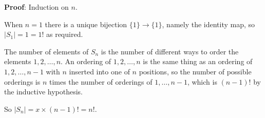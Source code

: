 \begin{paracol}{2}


\switchcolumn


\textbf{Proof}: Induction on $n$.

When $n = 1$ there is a unique bijection $\{1\} \rightarrow \{1\}$, namely the identity map, so $\mid S_1 \mid = 1 = 1!$ as required.

The number of elements of $S_n$ is the number of different ways to order the elements $1, 2, \dots, n$. An ordering of $1, 2, \dots, n$ is the same thing as an ordering of $1, 2, \dots, n-1$ with $n$ inserted into one of $n$ positions, so the number of possible orderings is $n$ times the number of orderings of $1, \dots, n-1$, which is $(n-1)!$ by the inductive hypothesis.

So $\mid S_n \mid = x \times (n-1)! = n!$.

\end{paracol}

